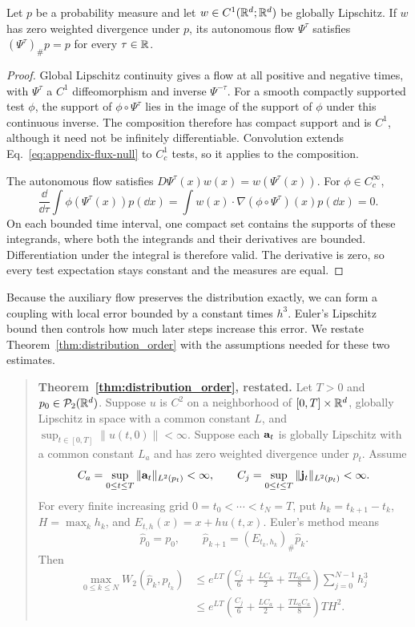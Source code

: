 \begin{proposition}
\label{prop:frozen-preservation}
Let $p$ be a probability measure and let $w\in C^1(\mathbb R^d;\mathbb R^d)$ be globally Lipschitz. If $w$ has zero weighted divergence under $p$, its autonomous flow $\Psi^\tau$ satisfies $(\Psi^\tau)_\#p=p$ for every $\tau\in\mathbb R$.
\end{proposition}
\begin{proof}
Global Lipschitz continuity gives a flow at all positive and negative times, with $\Psi^\tau$ a $C^1$ diffeomorphism and inverse $\Psi^{-\tau}$. For a smooth compactly supported test $\phi$, the support of $\phi\circ\Psi^\tau$ lies in the image of the support of $\phi$ under this continuous inverse. The composition therefore has compact support and is $C^1$, although it need not be infinitely differentiable. Convolution extends Eq.~\eqref{eq:appendix-flux-null} to $C_c^1$ tests, so it applies to the composition.

The autonomous flow satisfies $D\Psi^\tau(x)w(x)=w(\Psi^\tau(x))$. For $\phi\in C_c^\infty$,
\[
 \frac{\dd}{\dd\tau}\int\phi(\Psi^\tau(x))p(\dd x)
 =\int w(x)\cdot\nabla(\phi\circ \Psi^\tau)(x)p(\dd x)=0.
\]
On each bounded time interval, one compact set contains the supports of these integrands, where both the integrands and their derivatives are bounded. Differentiation under the integral is therefore valid. The derivative is zero, so every test expectation stays constant and the measures are equal.
\end{proof}

Because the auxiliary flow preserves the distribution exactly, we can form a coupling with local error bounded by a constant times $h^3$. Euler's Lipschitz bound then controls how much later steps increase this error. We restate Theorem~\ref{thm:distribution_order} with the assumptions needed for these two estimates.

\begin{quote}
\textbf{Theorem~\ref{thm:distribution_order}, restated.}
Let $T>0$ and $p_0\in\mathcal P_2(\mathbb R^d)$. Suppose $u$ is $C^2$ on a neighborhood of $[0,T]\times\mathbb R^d$, globally Lipschitz in space with a common constant $L$, and $\sup_{t\in[0,T]}\|u(t,0)\|<\infty$. Suppose each $\mathbf a_t$ is globally Lipschitz with a common constant $L_a$ and has zero weighted divergence under $p_t$. Assume
\[
 C_a=\sup_{0\le t\le T}\|\mathbf a_t\|_{L^2(p_t)}<\infty,
 \qquad C_j=\sup_{0\le t\le T}\|\mathbf j_t\|_{L^2(p_t)}<\infty.
\]
For every finite increasing grid $0=t_0<\cdots<t_N=T$, put $h_k=t_{k+1}-t_k$, $H=\max_kh_k$, and $E_{t,h}(x)=x+hu(t,x)$. Euler's method means
\[
 \widehat p_0=p_0,\qquad
 \widehat p_{k+1}=(E_{t_k,h_k})_\#\widehat p_k.
\]
Then
\begin{equation}
 \begin{aligned}
 \max_{0\le k\le N}W_2(\widehat p_k,p_{t_k})
 &\le e^{LT}\left(\frac{C_j}{6}+\frac{LC_a}{2}+\frac{TL_aC_a}{8}\right)
       \sum_{j=0}^{N-1}h_j^3\\
 &\le e^{LT}\left(\frac{C_j}{6}+\frac{LC_a}{2}+\frac{TL_aC_a}{8}\right)TH^2.
 \end{aligned}
 \label{eq:general-bound-full}
\end{equation}
\end{quote}

